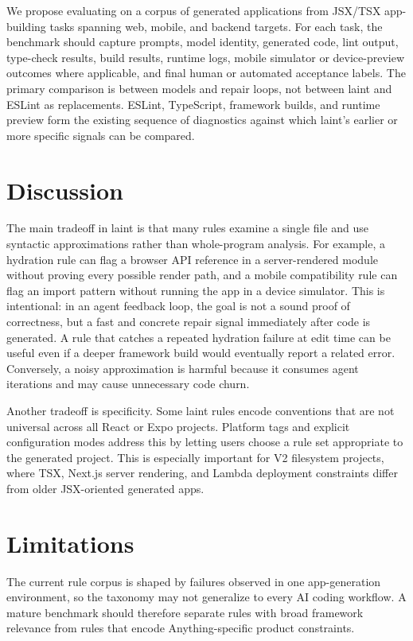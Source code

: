 \documentclass[11pt]{article}
\begin{document}
We propose evaluating on a corpus of generated applications from JSX/TSX app-building tasks spanning web, mobile, and backend targets. For each task, the benchmark should capture prompts, model identity, generated code, lint output, type-check results, build results, runtime logs, mobile simulator or device-preview outcomes where applicable, and final human or automated acceptance labels. The primary comparison is between models and repair loops, not between laint and ESLint as replacements. ESLint, TypeScript, framework builds, and runtime preview form the existing sequence of diagnostics against which laint's earlier or more specific signals can be compared.

\section{Discussion}

The main tradeoff in laint is that many rules examine a single file and use syntactic approximations rather than whole-program analysis. For example, a hydration rule can flag a browser API reference in a server-rendered module without proving every possible render path, and a mobile compatibility rule can flag an import pattern without running the app in a device simulator. This is intentional: in an agent feedback loop, the goal is not a sound proof of correctness, but a fast and concrete repair signal immediately after code is generated. A rule that catches a repeated hydration failure at edit time can be useful even if a deeper framework build would eventually report a related error. Conversely, a noisy approximation is harmful because it consumes agent iterations and may cause unnecessary code churn.

Another tradeoff is specificity. Some laint rules encode conventions that are not universal across all React or Expo projects. Platform tags and explicit configuration modes address this by letting users choose a rule set appropriate to the generated project. This is especially important for V2 filesystem projects, where TSX, Next.js server rendering, and Lambda deployment constraints differ from older JSX-oriented generated apps.

\section{Limitations}

The current rule corpus is shaped by failures observed in one app-generation environment, so the taxonomy may not generalize to every AI coding workflow. A mature benchmark should therefore separate rules with broad framework relevance from rules that encode Anything-specific product constraints.
\end{document}
